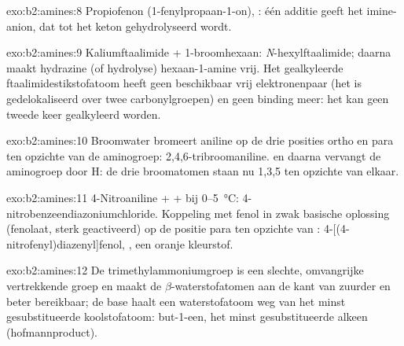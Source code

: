 \begin{solution}{exo:b2:amines:8}
Propiofenon (1-fenylpropaan-1-on), : één additie geeft het imine-anion,
dat tot het keton gehydrolyseerd wordt.
\end{solution}

\begin{solution}{exo:b2:amines:9}
Kaliumftaalimide + 1-broomhexaan: \textit{N}-hexylftaalimide; daarna maakt hydrazine (of hydrolyse)
hexaan-1-amine vrij. Het gealkyleerde ftaalimidestikstofatoom heeft geen beschikbaar vrij elektronenpaar (het is
gedelokaliseerd over twee carbonylgroepen) en geen binding  meer: het kan geen tweede keer gealkyleerd worden.
\end{solution}

\begin{solution}{exo:b2:amines:10}
Broomwater bromeert aniline op de drie posities ortho en para ten opzichte van de aminogroep:
2,4,6-tribroomaniline.  en daarna  vervangt de aminogroep door H: de drie
broomatomen staan nu 1,3,5 ten opzichte van elkaar.
\end{solution}

\begin{solution}{exo:b2:amines:11}
4-Nitroaniline +  +  bij 0--\qty{5}{\degreeCelsius}: 4-nitrobenzeendiazoniumchloride.
Koppeling met fenol in zwak basische oplossing (fenolaat, sterk geactiveerd) op de
positie para ten opzichte van : 4-[(4-nitrofenyl)diazenyl]fenol, , een oranje
kleurstof.
\end{solution}

\begin{solution}{exo:b2:amines:12}
De trimethylammoniumgroep is een slechte, omvangrijke vertrekkende groep en maakt de $\beta$-waterstofatomen aan de
kant van  zuurder en beter bereikbaar; de base haalt een waterstofatoom weg van het minst
gesubstitueerde koolstofatoom: but-1-een, het minst gesubstitueerde alkeen (hofmannproduct).
\end{solution}

